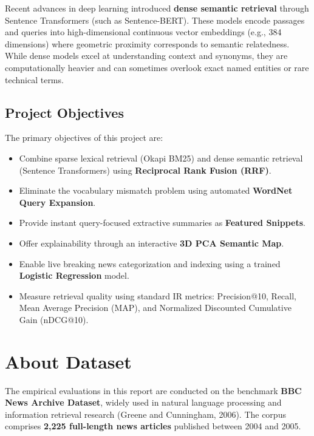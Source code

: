 \documentclass[11pt,a4paper]{article}
\begin{document}
Recent advances in deep learning introduced \textbf{dense semantic retrieval} through Sentence Transformers (such as Sentence-BERT). These models encode passages and queries into high-dimensional continuous vector embeddings (e.g., 384 dimensions) where geometric proximity corresponds to semantic relatedness. While dense models excel at understanding context and synonyms, they are computationally heavier and can sometimes overlook exact named entities or rare technical terms.

\subsection{Project Objectives}
The primary objectives of this project are:
\begin{itemize}[leftmargin=1.5em]
    \item Combine sparse lexical retrieval (Okapi BM25) and dense semantic retrieval (Sentence Transformers) using \textbf{Reciprocal Rank Fusion (RRF)}.
    \item Eliminate the vocabulary mismatch problem using automated \textbf{WordNet Query Expansion}.
    \item Provide instant query-focused extractive summaries as \textbf{Featured Snippets}.
    \item Offer explainability through an interactive \textbf{3D PCA Semantic Map}.
    \item Enable live breaking news categorization and indexing using a trained \textbf{Logistic Regression} model.
    \item Measure retrieval quality using standard IR metrics: Precision@10, Recall, Mean Average Precision (MAP), and Normalized Discounted Cumulative Gain (nDCG@10).
\end{itemize}

\newpage

\section{About Dataset}

The empirical evaluations in this report are conducted on the benchmark \textbf{BBC News Archive Dataset}, widely used in natural language processing and information retrieval research (Greene and Cunningham, 2006). The corpus comprises \textbf{2,225 full-length news articles} published between 2004 and 2005.
\end{document}
